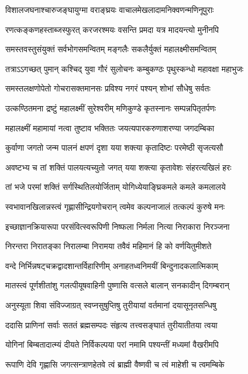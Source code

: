 \twolineshloka
{विशालजघनाश्चारुजङ्घायुग्मा वराङ्घ्रयः}
{वाचालमेखलादामनिक्वणन्मणिनूपुराः} %

\twolineshloka
{रणत्कङ्कणहस्ताब्जस्फुरत् करजरश्मयः}
{वसन्ति प्रमदा यत्र मादयन्त्यो मुनीनपि} %

\twolineshloka
{समस्तवस्तुसंयुक्तं सर्वभोगसमन्वितम्}
{मङ्गलैः सकलैर्युक्तं महालक्ष्मीसमन्वितम्} %

\twolineshloka
{तत्राऽऽगच्छत् पुमान् कश्चिद् युवा गौरं सुलोचनः}
{कम्बुकण्ठः पृथुस्कन्धो महावक्षा महाभुजः} %

\twolineshloka
{समस्तलक्षणोपेतो गोचरासक्तमानसः}
{प्रविश्य नगरं पश्यन् शोभां सौधेषु सर्वतः} %

\twolineshloka
{उत्कण्ठितमना द्रष्टुं महालक्ष्मीं सुरेश्वरीम्}
{मणिकुण्डे कृतस्नानः सम्पन्नपितृतर्पणः} %

\twolineshloka
{महालक्ष्मीं महामायां नत्वा तुष्टाव भक्तितः}
{जयत्यपारकरुणाशरण्या जगदम्बिका} %

\twolineshloka
{कुर्वाणा जगतो जन्म पालनं क्षपणं दृशा}
{यया शक्त्या कृतादिष्टः परमेष्ठी सृजत्यसौ} %

\twolineshloka
{अवष्टभ्य च तां शक्तिं पालयत्यच्युतो जगत्}
{यया शक्त्या कृतावेशः संहरत्यखिलं हरः} %

\twolineshloka
{तां भजे परमां शक्तिं सर्गस्थितिलयोर्जिताम्}
{योगिध्येयाङ्घ्रिकमले कमले कमलालये} %

\twolineshloka
{स्वभावानखिलान्नस्त्वं गृह्णासीन्द्रियगोचरान्}
{त्वमेव कल्पनाजालं तत्कल्पं कुरुषे मनः} %

\twolineshloka
{इच्छाज्ञानक्रियारूपा परसंवित्स्वरूपिणी}
{निष्फला निर्मला नित्या निराकारा निरञ्जना} %

\twolineshloka
{निरन्तरा निरातङ्का निरालम्बा निरामया}
{तवैवं महिमानं हि को वर्णयितुमीशते} %

\twolineshloka
{वन्दे निर्भिन्नषट्चक्रद्वादशान्तर्विहारिणीम्}
{अनाहतध्वनिमयीं बिन्दुनादकलात्मिकाम्} %

\twolineshloka
{मातस्त्वं पूर्णशीतांशु गलत्पीयूषवाहिनी}
{पुष्णासि वत्सले बालान् सनकादीन् दिगम्बरान्} %

\twolineshloka
{अनुस्यूता शिवा संविज्जाग्रत् स्वप्नसुषुप्तिषु}
{तुरीयायां वर्तमानां दयासूनृतसन्धिषु} %

\twolineshloka
{ददासि प्राणिनां सर्वाः सततं ब्रह्मसम्पदः}
{संहृत्य तत्त्वसङ्घातं तुरीयातीतया त्वया} %

\twolineshloka
{योगिनां बिम्बतादात्म्यं दीयते निर्विकल्पया}
{परां नमामि पश्यन्तीं मध्यमां वैखरीमपि} %

\twolineshloka
{रूपाणि देवि गृह्णासि जगत्सन्त्राणहेतवे}
{त्वं ब्राह्मी वैष्णवी च त्वं माहेशी च त्वमम्बिके} %

